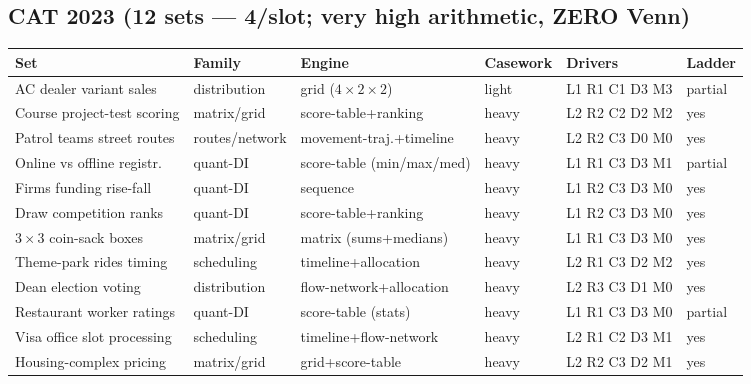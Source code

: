 \documentclass[11pt,a4paper]{article}
\newcommand{\invtab}{\footnotesize}
\begin{document}
\subsection{CAT 2023 (12 sets --- 4/slot; very high arithmetic, ZERO Venn)}
{\invtab
\begin{longtable}{p{3.0cm}p{2.05cm}p{2.5cm}p{1.2cm}p{2.05cm}p{1.7cm}}
\toprule
\textbf{Set} & \textbf{Family} & \textbf{Engine} & \textbf{Casework} & \textbf{Drivers} & \textbf{Ladder} \\
\midrule
\endhead
AC dealer variant sales & distribution & grid ($4{\times}2{\times}2$) & light & L1 R1 C1 D3 M3 & partial \\
Course project-test scoring & matrix/grid & score-table+ranking & heavy & L2 R2 C2 D2 M2 & yes \\
Patrol teams street routes & routes/network & movement-traj.+timeline & heavy & L2 R2 C3 D0 M0 & yes \\
Online vs offline registr. & quant-DI & score-table (min/max/med) & heavy & L1 R1 C3 D3 M1 & partial \\
Firms funding rise-fall & quant-DI & sequence & heavy & L1 R2 C3 D3 M0 & yes \\
Draw competition ranks & quant-DI & score-table+ranking & heavy & L1 R2 C3 D3 M0 & yes \\
$3\times3$ coin-sack boxes & matrix/grid & matrix (sums+medians) & heavy & L1 R1 C3 D3 M0 & yes \\
Theme-park rides timing & scheduling & timeline+allocation & heavy & L2 R1 C3 D2 M2 & yes \\
Dean election voting & distribution & flow-network+allocation & heavy & L2 R3 C3 D1 M0 & yes \\
Restaurant worker ratings & quant-DI & score-table (stats) & heavy & L1 R1 C3 D3 M0 & partial \\
Visa office slot processing & scheduling & timeline+flow-network & heavy & L2 R1 C2 D3 M1 & yes \\
Housing-complex pricing & matrix/grid & grid+score-table & heavy & L2 R2 C3 D2 M1 & yes \\
\bottomrule
\end{longtable}}
\end{document}
